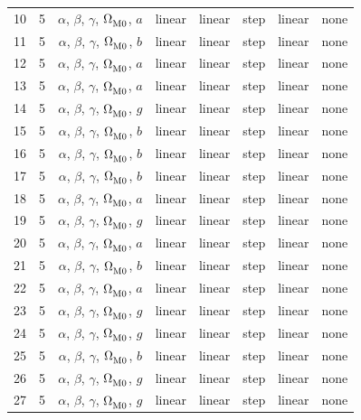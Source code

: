 \begin{longtable}{c c c c c c c c}
    \hline
    10 & 5 & $\alpha$, $\beta$, $\gamma$, $\Omega_{\rm M0}^{}$, $a$ & linear & linear & step & linear & none \\
    11 & 5 & $\alpha$, $\beta$, $\gamma$, $\Omega_{\rm M0}^{}$, $b$ & linear & linear & step & linear & none \\
    12 & 5 & $\alpha$, $\beta$, $\gamma$, $\Omega_{\rm M0}^{}$, $a$ & linear & linear & step & linear & none \\
    13 & 5 & $\alpha$, $\beta$, $\gamma$, $\Omega_{\rm M0}^{}$, $a$ & linear & linear & step & linear & none \\
    14 & 5 & $\alpha$, $\beta$, $\gamma$, $\Omega_{\rm M0}^{}$, $g$ & linear & linear & step & linear & none \\
    15 & 5 & $\alpha$, $\beta$, $\gamma$, $\Omega_{\rm M0}^{}$, $b$ & linear & linear & step & linear & none \\
    16 & 5 & $\alpha$, $\beta$, $\gamma$, $\Omega_{\rm M0}^{}$, $b$ & linear & linear & step & linear & none \\
    17 & 5 & $\alpha$, $\beta$, $\gamma$, $\Omega_{\rm M0}^{}$, $b$ & linear & linear & step & linear & none \\
    18 & 5 & $\alpha$, $\beta$, $\gamma$, $\Omega_{\rm M0}^{}$, $a$ & linear & linear & step & linear & none \\
    19 & 5 & $\alpha$, $\beta$, $\gamma$, $\Omega_{\rm M0}^{}$, $g$ & linear & linear & step & linear & none \\
    20 & 5 & $\alpha$, $\beta$, $\gamma$, $\Omega_{\rm M0}^{}$, $a$ & linear & linear & step & linear & none \\
    21 & 5 & $\alpha$, $\beta$, $\gamma$, $\Omega_{\rm M0}^{}$, $b$ & linear & linear & step & linear & none \\
    22 & 5 & $\alpha$, $\beta$, $\gamma$, $\Omega_{\rm M0}^{}$, $a$ & linear & linear & step & linear & none \\
    23 & 5 & $\alpha$, $\beta$, $\gamma$, $\Omega_{\rm M0}^{}$, $g$ & linear & linear & step & linear & none \\
    24 & 5 & $\alpha$, $\beta$, $\gamma$, $\Omega_{\rm M0}^{}$, $g$ & linear & linear & step & linear & none \\
    25 & 5 & $\alpha$, $\beta$, $\gamma$, $\Omega_{\rm M0}^{}$, $b$ & linear & linear & step & linear & none \\
    26 & 5 & $\alpha$, $\beta$, $\gamma$, $\Omega_{\rm M0}^{}$, $g$ & linear & linear & step & linear & none \\
    27 & 5 & $\alpha$, $\beta$, $\gamma$, $\Omega_{\rm M0}^{}$, $g$ & linear & linear & step & linear & none \\

\end{longtable}
